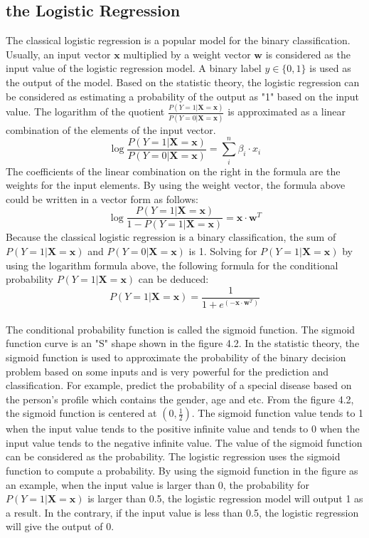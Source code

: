 \subsection{the Logistic Regression}
The classical logistic regression is a popular model for the binary classification. Usually, an input vector $\textbf{x}$ multiplied  by a weight vector $\textbf{w}$ is considered as the input value of the logistic regression model. A binary label $y \in \{0,1\}$ is used as the output of the model. Based on the statistic theory, the logistic regression can be considered as estimating a probability of the output as "1" based on the input value. The logarithm of the quotient $\frac{P(Y=1|\textbf{X}=\textbf{x})}{P(Y=0|\textbf{X}=\textbf{x})}$ is approximated as a linear combination of the elements of the input vector. 
\begin{equation}
\log \frac{P(Y=1|\textbf{X}=\textbf{x})}{P(Y=0|\textbf{X}=\textbf{x})} = \sum_i^n \beta_i \cdot x_i 
\end{equation}
The coefficients of the linear combination on the right in the formula are the weights for the input elements. By using the weight vector, the formula above could be written in a vector form as follows:
\begin{equation}
 \log \frac{P(Y=1|\textbf{X}=\textbf{x})}{1-P(Y=1|\textbf{X}=\textbf{x})}=\textbf{x} \cdot \textbf{w}^T
\end{equation}
Because the classical logistic regression is a binary classification, the sum of $P(Y=1|\textbf{X}=\textbf{x})$ and $P(Y=0|\textbf{X}=\textbf{x})$ is 1. Solving for $P(Y=1|\textbf{X}=\textbf{x})$ by using the logarithm formula above, the following formula for the conditional probability $P(Y=1|\textbf{X}=\textbf{x})$ can be deduced:
\begin{equation}
P(Y=1|\textbf{X}=\textbf{x}) = \frac{1}{1+e^{(-\textbf{x} \cdot \textbf{w}^T)}}
\end{equation}
\\
The conditional probability function is called the sigmoid function. The sigmoid function curve is an "S" shape shown in the figure 4.2. In the statistic theory, the sigmoid function is used to approximate the probability of the binary decision problem based on some inputs and is very powerful for the prediction and classification. For example, predict the probability of a special disease based on the person's profile which contains the gender, age and etc. From the figure 4.2, the sigmoid function is centered at $(0,\frac{1}{2})$.  The sigmoid function value tends to 1 when the input value tends to the positive infinite value and tends to 0 when the input value tends to the negative infinite value. The value of the sigmoid function can be considered as the probability. The logistic regression uses the sigmoid function to compute a probability. By using the sigmoid function in the figure as an example, when the input value is larger than 0, the probability for $P(Y=1|\textbf{X}=\textbf{x})$ is larger than 0.5, the logistic regression model will output 1 as a result. In the contrary, if the input value is less than 0.5, the logistic regression will give the output of 0. 

